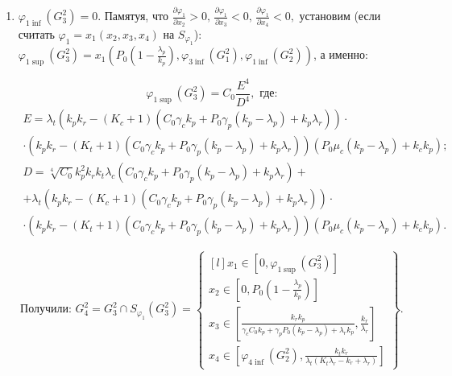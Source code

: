 \documentclass[12pt,a4paper]{article}
\newcommand{\xin}[3]{x_{#1} \in \left[ #2, #3 \right]}
\newcommand{\set}[1]{
    \left\{ \begin{matrix*}[l] #1 \end{matrix*}     
    \right\}   
    }
\begin{document}
\begin{enumerate}
\begin{enumerate}
        \item $\varphi_{1 \inf}(G_3^2) = 0$. Памятуя, что $\frac{\partial \varphi_1}{\partial x_2} > 0,\,  \frac{\partial \varphi_1}{\partial x_3} < 0,\,  \frac{\partial \varphi_1}{\partial x_4} < 0,$ установим  (если считать $ \varphi_1 = x_1(x_2, x_3, x_4)$ на $S_{\varphi_1}$): $ \varphi_{1 \sup}(G_3^2) =  x_1 \left( P_0 \left( 1 - \frac{\lambda_p}{k_p} \right), \varphi_{3 \inf}(G_1^2), \varphi_{1 \inf}(G_2^2) \right)$, а именно: 
        
        $$ \varphi_{1 \sup}(G_3^2) =  C_0 \dfrac{E^4}{D^4}, \text{ где:}$$
        \begin{multline*}
            E = \lambda_{t} \left(k_{p} k_{r} - \left(K_{c} + 1\right) \left(C_{0} \gamma_{c} k_{p} + P_{0} \gamma_{p} \left(k_{p} - \lambda_{p}\right) + k_{p} \lambda_{r}\right)\right) \cdot
            \\
            \cdot \left(k_{p} k_{r} - \left(K_{t} + 1\right) \left(C_{0} \gamma_{c} k_{p} + P_{0} \gamma_{p} \left(k_{p} - \lambda_{p}\right) + k_{p} \lambda_{r}\right)\right) \left(P_{0} \mu_{c} \left(k_{p} - \lambda_{p}\right) + k_{c} k_{p}\right);
        \end{multline*}
        \begin{multline*}
            D = \sqrt[4]{C_{0}} k_{p}^{2} k_{r} k_{t} \lambda_{c} \left(C_{0} \gamma_{c} k_{p} + P_{0} \gamma_{p} \left(k_{p} - \lambda_{p}\right) + k_{p} \lambda_{r}\right) + 
            \\
            +\lambda_{t} \left(k_{p} k_{r} - \left(K_{c} + 1\right) \left(C_{0} \gamma_{c} k_{p} + P_{0} \gamma_{p} \left(k_{p} - \lambda_{p}\right) + k_{p} \lambda_{r}\right)\right) \cdot
            \\
            \cdot \left(k_{p} k_{r} - \left(K_{t} + 1\right) \left(C_{0} \gamma_{c} k_{p} + P_{0} \gamma_{p} \left(k_{p} - \lambda_{p}\right) + k_{p} \lambda_{r}\right)\right) \left(P_{0} \mu_{c} \left(k_{p} - \lambda_{p}\right) + k_{c} k_{p}\right).
        \end{multline*}

        $$\text{Получили: } G_4^2 = G_3^2 \cap S_{\varphi_1}(G_3^2) = 
        \set{
            \xin{1}{0}{ \varphi_{1 \sup}(G_3^2) } \\
            \xin{2}{0}{P_0\left( 1 - \frac{\lambda_p}{k_p} \right)} \\
            \xin{3}{\frac{k_r k_p}{\gamma_c C_0 k_p + \gamma_p P_0 (k_p - \lambda_p) + \lambda_r k_p}}{\frac{k_r}{\lambda_r}} \\
            \xin{4}{\varphi_{4 \inf}(G_2^2)}{\frac{k_t k_r}{\lambda_t(K_t \lambda_r - k_r + \lambda_r)}}
            }.
        $$

    \end{enumerate}


\end{enumerate}
\end{document}
